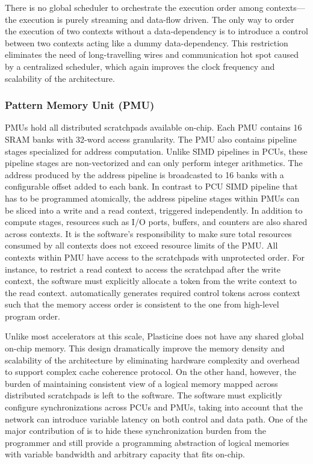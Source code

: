 There is no global scheduler to orchestrate the execution order among contexts---the execution is purely
streaming and data-flow driven. 
The only way to order the execution of two contexts without a data-dependency is to 
introduce a control  between two contexts acting like a dummy data-dependency.
This restriction eliminates the need of long-travelling wires and communication hot spot caused by a
centralized scheduler, which  again improves the clock frequency and scalability of the architecture.

\subsubsection{Pattern Memory Unit (PMU)}
PMUs hold all distributed scratchpads available on-chip. 
Each PMU contains 16 SRAM banks with
32-word access granularity. The PMU also contains pipeline stages specialized for address
computation. Unlike SIMD pipelines in PCUs, these pipeline stages are non-vectorized and can only 
perform integer arithmetics. 
The address produced by the address pipeline is broadcasted to 16 banks with a configurable offset added to each bank.
In contrast to PCU SIMD pipeline that has to be programmed atomically, the address pipeline stages 
within PMUs can be sliced into a write and a read context, triggered independently.
In addition to compute stages, resources such as I/O ports, buffers, and counters are also shared across contexts.
It is the software's responsibility to make sure total resources consumed by all
contexts does not exceed resource limits of the PMU.
All contexts within PMU have access to the scratchpads with unprotected order. For instance, to
restrict a read context to access the scratchpad after the write context, the software must explicitly allocate
a token from the write context to the read context.
\name automatically generates required control tokens across context such that the memory access order is
consistent to the one from high-level program order.

Unlike most accelerators at this scale, Plasticine does not have any shared global on-chip memory. 
This design dramatically improve the memory density and scalability of the architecture 
by eliminating hardware complexity and overhead to support complex cache coherence protocol.
On the other hand, however, the burden of maintaining consistent view of a logical memory mapped
across distributed scratchpads is left to the software.
The software must explicitly configure synchronizations across PCUs and PMUs, taking into account
that the network can introduce variable latency on both control and data path.
One of the major contribution of \name is to hide these synchronization burden from the programmer
and still provide a programming abstraction of logical memories with variable bandwidth and 
arbitrary capacity that fits on-chip.

